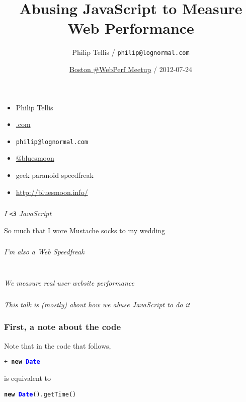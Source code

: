 \documentclass{beamer}
\author{Philip Tellis / \texttt{philip@lognormal.com}}
\title{Abusing JavaScript to Measure Web Performance}
\date{\href{http://www.meetup.com/Web-Performance-Boston/events/72553762/}{Boston \#WebPerf Meetup} / 2012-07-24}
\newcommand{\innersplash}[1]{
  \begin{center}
    \large \textrm{\textit{ #1 } }
  \end{center}
}
\newcommand{\splashslide}[2][{}]{
  \begin{frame}
  \frametitle{#1}
  \innersplash{#2}
  \end{frame}
}
\def\green<#1>#2{\textcolor<#1>{dark-green}{\textbf<#1>{#2}}}
\def\blue<#1>#2{\textcolor<#1>{blue}{\textbf<#1>{#2}}}
\begin{document}
\begin{frame}
  \begin{itemize}
  \item Philip Tellis
  \item \href{http://www.lognormal.com/}{\textrm{\textcolor{med-gray}{.com}}}
  \item \small{\texttt{philip@lognormal.com}}
  \item \href{http://twitter.com/bluesmoon}{@bluesmoon}
  \item geek paranoid speedfreak
  \item \href{http://bluesmoon.info/}{http://bluesmoon.info/}
  \end{itemize}
\end{frame}

\splashslide{I \texttt{<3} JavaScript}

\begin{frame}{So much that I wore Mustache socks to my wedding}
\end{frame}

\splashslide{I'm also a Web Speedfreak}

\splashslide{ \\ We measure real user website performance}

\splashslide{This talk is (mostly) about how we abuse JavaScript to do it}

\begin{frame}
  \titlepage
\end{frame}

\begin{frame}[fragile]
\frametitle{First, a note about the code}
\begin{center}
Note that in the code that follows,

\vspace{1.5em}
\texttt{+ \green<1>{new} \blue<1>{Date}}

\vspace{1.5em}
is equivalent to

\vspace{1.5em}
\texttt{\green<1>{new} \blue<1>{Date}().getTime()}
\end{center}
\end{frame}
\end{document}
